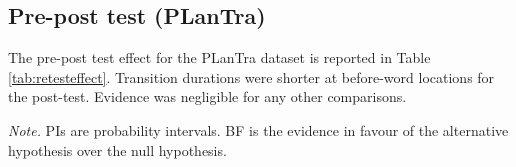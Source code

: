 \documentclass[
  english,
  man,floatsintext]{apa7}
\begin{document}
\clearpage
\makeatletter
\efloat@restorefloats
\makeatother


\begin{appendix}
\section{}
\hypertarget{pre-post-test-plantra}{%
\subsection{Pre-post test (PLanTra)}\label{pre-post-test-plantra}}

The pre-post test effect for the PLanTra dataset is reported in Table
\ref{tab:retesteffect}. Transition durations were shorter at before-word
locations for the post-test. Evidence was negligible for any other
comparisons.

\begin{center}
\begin{ThreePartTable}

\begin{TableNotes}[para]
\normalsize{\textit{Note.} PIs are probability intervals. BF is the evidence in favour of the alternative hypothesis over the null hypothesis.}
\end{TableNotes}

\footnotesize{

}
\end{ThreePartTable}
\end{center}
\end{appendix}
\end{document}
